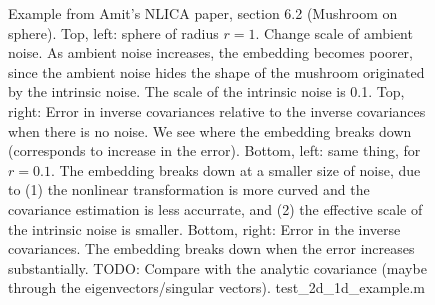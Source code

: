 \documentclass[12pt]{article}
\begin{document}
\begin{figure}[h!]
\caption{Example from Amit's NLICA paper, section 6.2 (Mushroom on sphere). Top, left: sphere of radius $r=1$. Change scale of ambient noise. As ambient noise increases, the embedding becomes poorer, since the ambient noise hides the shape of the mushroom originated by the intrinsic noise. The scale of the intrinsic noise is 0.1. Top, right: Error in inverse covariances relative to the inverse covariances when there is no noise. We see where the embedding breaks down (corresponds to increase in the error). Bottom, left: same thing, for $r=0.1$. The embedding breaks down at a smaller size of noise, due to (1) the nonlinear transformation is more curved and the covariance estimation is less accurrate, and (2) the effective scale of the intrinsic noise is smaller. Bottom, right: Error in the inverse covariances. The embedding breaks down when the error increases substantially. TODO: Compare with the analytic covariance (maybe through the eigenvectors/singular vectors). test\_2d\_1d\_example.m}
\end{figure}
\end{document}

